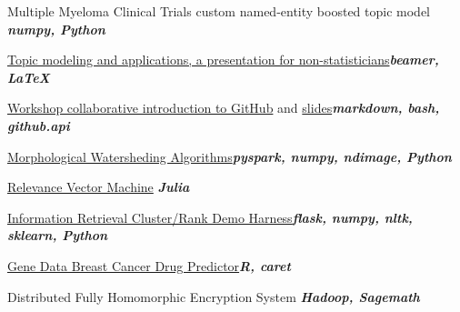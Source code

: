 \documentclass{article}
\newenvironment{**mylist}[2]{
  \subsubsection*{#1\hfill\small#2}
  \small
  \begin{list}{}{}
   \setlength{\topsep}{0pt}
   \setlength{\itemsep}{1pt}
   \setlength{\parskip}{0pt}
   \setlength{\parsep}{0pt}}{\end{list}\normalsize}
\newcommand{\LUx}[1]{{\bf\em #1}}
\begin{document}
\pagebreak
{}
\small
\vspace{-.08in}\begin{**mylist}{}{}
\item Multiple Myeloma Clinical Trials custom named-entity boosted topic model \hfill\LUx{numpy, Python}
\item \href{https://github.com/probinso/expert-modeling-system/blob/master/decks/itds/pres.pdf}{Topic modeling and applications, a presentation for non-statisticians}\hfill\LUx{beamer, \LaTeX}
\item \href{https://github.com/probinso/ABC}{Workshop collaborative introduction to GitHub} and \href{https://github.com/probinso/introduction-git}{slides}\hfill\LUx{markdown, bash, github.api}
\item \href{https://github.com/probinso/morphological-watersheds}{Morphological Watersheding Algorithms}\hfill\LUx{pyspark, numpy, ndimage, Python}
\item \href{https://github.com/probinso/RVM.jl/blob/master/src/RVM.jl}{Relevance Vector Machine} \hfill\LUx{Julia}
\item \href{https://github.com/probinso/IR-cluster-rank-demo}{Information Retrieval Cluster/Rank Demo Harness}\hfill\LUx{flask, numpy, nltk, sklearn, Python}
\item \href{https://github.com/probinso/stats-methods-project}{Gene Data Breast Cancer Drug Predictor}\hfill\LUx{R, caret}
\item Distributed Fully Homomorphic Encryption System \hfill\LUx{Hadoop, Sagemath}

\end{**mylist}
\end{document}
